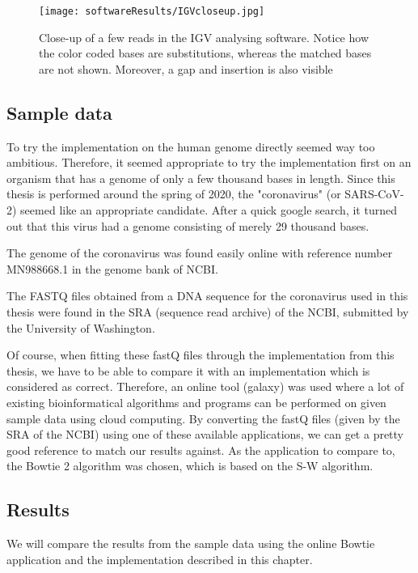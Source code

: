 \begin{figure}[H]
	\centering
	\texttt{[image: softwareResults/IGVcloseup.jpg]}
	\caption{Close-up of a few reads in the IGV analysing software. Notice how the color coded bases are substitutions, whereas the matched bases are not shown. Moreover, a gap and insertion is also visible}
	\label{fig:IGVcloseup}
\end{figure}

\subsection{Sample data}

To try the implementation on the human genome directly seemed way too ambitious. Therefore, it seemed appropriate to try the implementation first on an organism that has a genome of only a few thousand bases in length.
Since this thesis is performed around the spring of 2020, the "coronavirus" (or SARS-CoV-2) seemed like an appropriate candidate. After a quick google search, it turned out that this virus had a genome consisting of merely 29 thousand bases.

The genome of the coronavirus was found easily online with reference number MN988668.1 in the genome bank of NCBI.

The FASTQ files obtained from a DNA sequence for the coronavirus used in this thesis were found in the SRA (sequence read archive) of the NCBI, submitted by the University of Washington.

Of course, when fitting these fastQ files through the implementation from this thesis, we have to be able to compare it with an implementation which is considered as correct. Therefore, an online tool (galaxy) was used where a lot of existing bioinformatical algorithms and programs can be performed on given sample data using cloud computing. %
By converting the fastQ files (given by the SRA of the NCBI) using one of these available applications, we can get a pretty good reference to match our results against. As the application to compare to, the Bowtie 2 algorithm was chosen, which is based on the S-W algorithm.

\subsection{Results}

We will compare the results from the sample data using the online Bowtie application and the implementation described in this chapter.

